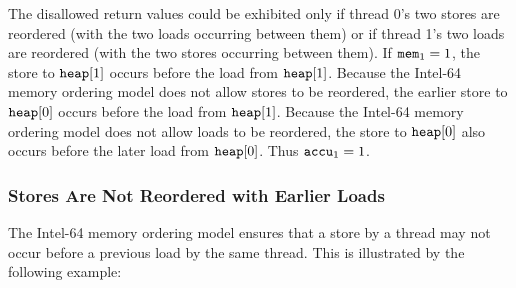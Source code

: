 \begin{table}[!hbt]
\noindent{}
\caption[Stores Are Not Reordered with Other Stores]{Stores Are Not Reordered with Other Stores \cite[Example 8-1]{ref:Intel}}
\label{tbl:litmus:intel:1}
\end{table}

\noindent
The disallowed return values could be exhibited only if thread 0’s two stores are reordered (with the two loads occurring between them) or if thread 1’s two loads are reordered (with the two stores occurring between them).
\bigbreak
\noindent
If $\texttt{mem}_1 = 1$, the store to $\texttt{heap}[1]$ occurs before the load from $\texttt{heap}[1]$.
Because the Intel-64 memory ordering model does not allow stores to be reordered, the earlier store to $\texttt{heap}[0]$ occurs before the load from $\texttt{heap}[1]$.
Because the Intel-64 memory ordering model does not allow loads to be reordered, the store to $\texttt{heap}[0]$ also occurs before the later load from $\texttt{heap}[0]$.
Thus $\texttt{accu}_1 = 1$.

\newpage

\subsubsection*{Stores Are Not Reordered with Earlier Loads}

The Intel-64 memory ordering model ensures that a store by a thread may not occur before a previous load by the same thread.
This is illustrated by the following example:

